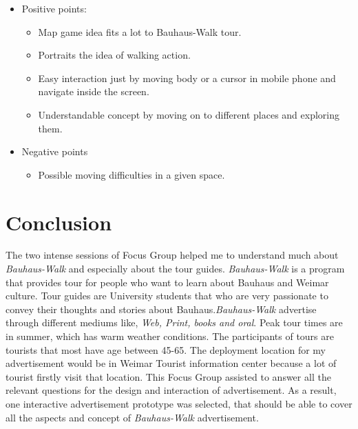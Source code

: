 \begin {enumerate}
\begin {itemize}

\item{Positive points:} 
\begin {itemize}

\item	Map game idea fits a lot to Bauhaus-Walk tour.
\item	Portraits the idea of walking action.
\item	Easy interaction just by moving body or a cursor in mobile phone and navigate inside the screen.
\item	Understandable concept by moving on to different places and exploring them. 
\end {itemize}

\item{Negative points}
\begin {itemize}
\item Possible moving difficulties in a given space.
\end {itemize}
\end {itemize}
\end {enumerate}

\newpage
\section{Conclusion}
The two intense sessions of Focus Group helped me to understand much about \emph{Bauhaus-Walk} and especially about the tour guides. \emph{Bauhaus-Walk} is a program that provides tour for people who want to learn about Bauhaus and Weimar culture. Tour guides are University students that who are very passionate to convey their thoughts and stories about Bauhaus.\emph{Bauhaus-Walk} advertise through different mediums like, \emph{Web, Print, books and oral}. Peak tour times are in summer, which has warm weather conditions. The participants of tours are tourists that most have age between 45-65. The deployment location for my advertisement would be in Weimar Tourist information center because a lot of tourist firstly visit that location. This Focus Group assisted to answer all the relevant questions for the design and interaction of advertisement. As a result, one interactive advertisement prototype was selected, that should be able to cover all the aspects and concept of \emph{Bauhaus-Walk} advertisement.

